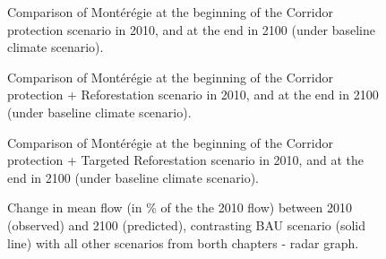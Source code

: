 \begin{figure}[h!]
 \caption{Comparison of Montérégie at the beginning of the Corridor protection scenario in 2010, and at the end in 2100 (under baseline climate scenario).}
 \label{fig:Corr_compare}
\end{figure}

\begin{figure}[h!]
 \caption{Comparison of Montérégie at the beginning of the Corridor protection + Reforestation scenario in 2010, and at the end in 2100 (under baseline climate scenario).}
 \label{fig:	CorrRef_compare}
\end{figure}

\begin{figure}[h!]
 \caption{Comparison of Montérégie at the beginning of the Corridor protection + Targeted Reforestation scenario in 2010, and at the end in 2100 (under baseline climate scenario).}
 \label{fig:	CorrRefT_compare}
\end{figure}


\begin{figure}[h!]
 \caption{Change in mean flow (in \% of the the 2010 flow) between 2010 (observed) and 2100 (predicted), contrasting BAU scenario (solid line) with all other scenarios from borth chapters - radar graph.}
 \label{fig:flow_radar_both}
\end{figure}
